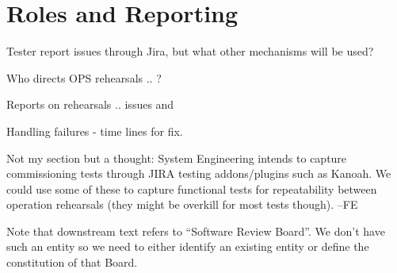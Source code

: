 


\section{Roles and Reporting}

Tester report issues through Jira, but what other mechanisms will be used?

Who directs OPS rehearsals .. ?

Reports on rehearsals .. issues and

Handling failures - time lines for fix.


\begin{note}
  Not my section but a thought: System Engineering intends to capture commissioning tests through JIRA testing addons/plugins such as Kanoah. We could use some of these to capture functional tests for repeatability between operation rehearsals (they might be overkill for most tests though). --FE
\end{note}

\begin{note}
  Note that downstream text refers to ``Software Review Board''. We don't have such an entity so we need to either identify an existing entity or define the constitution of that Board.
\end{note}



















